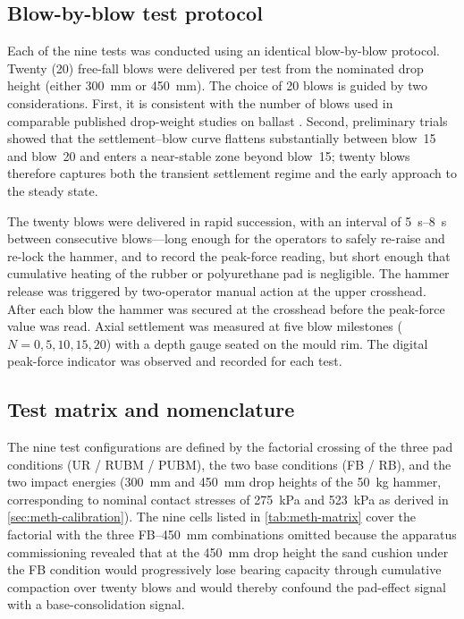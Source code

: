 \subsection{Blow-by-blow test protocol}
\label{sec:meth-blow-protocol}

Each of the nine tests was conducted using an identical blow-by-blow
protocol. Twenty (20) free-fall blows were delivered per test from the
nominated drop height (either \SI{300}{\milli\metre} or
\SI{450}{\milli\metre}). The choice of 20 blows is guided by two
considerations. First, it is consistent with the number of blows used in
comparable published drop-weight studies on ballast
\citep{Nimbalkar2012, Koohmishi2020, Zhang2023}. Second, preliminary trials
showed that the settlement--blow curve flattens substantially between
blow~15 and blow~20 and enters a near-stable zone beyond blow~15; twenty
blows therefore captures both the transient settlement regime and the
early approach to the steady state.

The twenty blows were delivered in rapid succession, with an interval of
\SIrange{5}{8}{\second} between consecutive blows---long enough for the
operators to safely re-raise and re-lock the hammer, and to record the
peak-force reading, but short enough that cumulative heating of the rubber
or polyurethane pad is negligible. The hammer release was triggered by
two-operator manual action at the upper crosshead. After each blow the
hammer was secured at the crosshead before the peak-force value was read.
Axial settlement was measured at five blow milestones ($N=0, 5, 10, 15,
20$) with a depth gauge seated on the mould rim. The digital peak-force
indicator was observed and recorded for each test.

\subsection{Test matrix and nomenclature}
\label{sec:meth-matrix}

The nine test configurations are defined by the factorial crossing of the
three pad conditions (\gls{UR} / \gls{RUBM} / \gls{PUBM}), the two base
conditions (\gls{FB} / \gls{RB}), and the two impact energies
(\SI{300}{\milli\metre} and \SI{450}{\milli\metre} drop heights of the
\SI{50}{\kilogram} hammer, corresponding to nominal contact stresses of
\SI{275}{\kilo\pascal} and \SI{523}{\kilo\pascal} as derived in
\cref{sec:meth-calibration}). The nine cells listed in
\cref{tab:meth-matrix} cover the factorial with the three
\gls{FB}--\SI{450}{\milli\metre} combinations omitted because the apparatus
commissioning revealed that at the \SI{450}{\milli\metre} drop height the
sand cushion under the \gls{FB} condition would progressively lose bearing
capacity through cumulative compaction over twenty blows and would thereby
confound the pad-effect signal with a base-consolidation signal.

